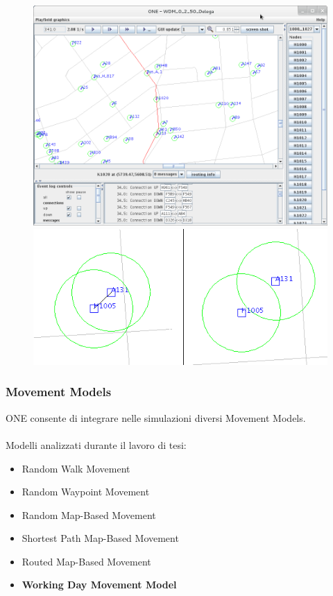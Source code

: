 \documentclass{beamer}
\begin{document}
\begin{frame}
\begin{figure}[ht]
\begin{minipage}[b]{0.4\linewidth}
\centering
\includegraphics[scale=0.12]{img/Schermata-ONE.png}
\end{minipage}
\hspace{0.5cm}
\begin{minipage}[b]{0.4\linewidth}
\centering
\includegraphics[scale=0.28]{img/connessioni.png}
\end{minipage}
\end{figure}
\end{frame}



\begin{frame}
\label{movement models}
\frametitle{Movement Models}
ONE consente di integrare nelle simulazioni diversi Movement Models.\\
\ \\
Modelli analizzati durante il lavoro di tesi:
\begin{itemize}
\item Random Walk Movement
\item Random Waypoint Movement
\item Random Map-Based Movement
\item Shortest Path Map-Based Movement
\item Routed Map-Based Movement
\item \textbf{Working Day Movement Model}
\end{itemize}
\end{frame}
\end{document}
